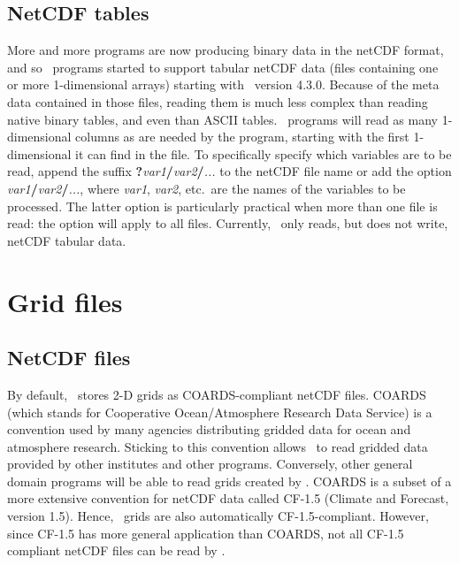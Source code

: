\subsection{NetCDF tables}

More and more programs are now producing binary data in the netCDF format, and so \GMT\ programs
started to support tabular netCDF data (files containing one or more 1-dimensional arrays) starting with \GMT\ version 4.3.0.
Because of the meta data contained in those files, reading them is much less complex than reading native binary tables,
and even than ASCII tables. \GMT\ programs will read as many 1-dimensional columns as are needed by the program, starting with the first
1-dimensional it can find in the file. To specifically specify which variables are to be read,
append the suffix \textbf{?}\emph{var1}\textbf{/}\emph{var2}\textbf{/}\emph{...} to the netCDF file name
or add the option \emph{var1}\textbf{/}\emph{var2}\textbf{/}\emph{...}, where \emph{var1}, \emph{var2}, etc.\
are the names of the variables to be processed. The latter option is particularly practical when more
than one file is read: the \Opt{bic} option will apply to all files.
Currently, \GMT\ only reads, but does not write, netCDF tabular data.

\section{Grid files}

\subsection{NetCDF files}

By default, \GMT\ stores 2-D grids as COARDS-compliant netCDF files.
COARDS (which stands for Cooperative Ocean/Atmosphere Research Data Service) is a convention used by
many agencies distributing gridded data for ocean and atmosphere research. Sticking to
this convention allows \GMT\ to read gridded data provided by other institutes
and other programs. Conversely, other general domain programs
will be able to read grids created by \GMT.
COARDS is a subset of a more extensive convention for netCDF data called CF-1.5 (Climate and
Forecast, version 1.5). Hence, \GMT\ grids are also automatically CF-1.5-compliant.
However, since CF-1.5 has more general application than COARDS, not all CF-1.5 compliant netCDF files
can be read by \GMT.

